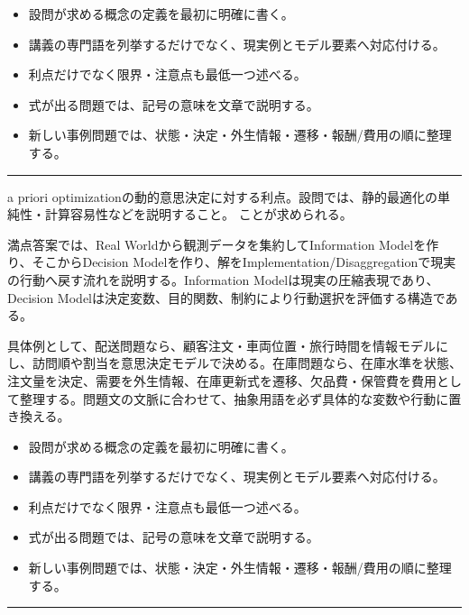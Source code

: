 \begin{itemize}
\item 設問が求める概念の定義を最初に明確に書く。
\item 講義の専門語を列挙するだけでなく、現実例とモデル要素へ対応付ける。
\item 利点だけでなく限界・注意点も最低一つ述べる。
\item 式が出る問題では、記号の意味を文章で説明する。
\item 新しい事例問題では、状態・決定・外生情報・遷移・報酬/費用の順に整理する。
\end{itemize}
\vspace{2mm}\hrule\vspace{2mm}
a priori optimizationの動的意思決定に対する利点。設問では、静的最適化の単純性・計算容易性などを説明すること。 ことが求められる。\par
{}
満点答案では、Real Worldから観測データを集約してInformation Modelを作り、そこからDecision Modelを作り、解をImplementation/Disaggregationで現実の行動へ戻す流れを説明する。Information Modelは現実の圧縮表現であり、Decision Modelは決定変数、目的関数、制約により行動選択を評価する構造である。\par
{}
具体例として、配送問題なら、顧客注文・車両位置・旅行時間を情報モデルにし、訪問順や割当を意思決定モデルで決める。在庫問題なら、在庫水準を状態、注文量を決定、需要を外生情報、在庫更新式を遷移、欠品費・保管費を費用として整理する。問題文の文脈に合わせて、抽象用語を必ず具体的な変数や行動に置き換える。\par
{}
\begin{itemize}
\item 設問が求める概念の定義を最初に明確に書く。
\item 講義の専門語を列挙するだけでなく、現実例とモデル要素へ対応付ける。
\item 利点だけでなく限界・注意点も最低一つ述べる。
\item 式が出る問題では、記号の意味を文章で説明する。
\item 新しい事例問題では、状態・決定・外生情報・遷移・報酬/費用の順に整理する。
\end{itemize}
\vspace{2mm}\hrule\vspace{2mm}